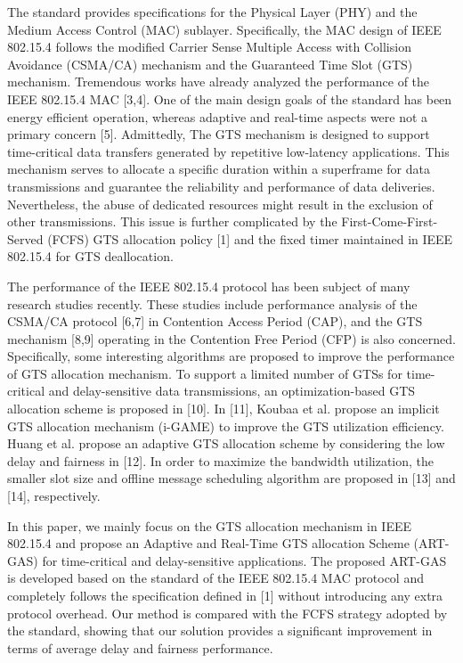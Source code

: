 \documentclass[letterpaper]{sig-alternate-10pt}
\begin{document}
The standard provides specifications for the Physical Layer (PHY) and the Medium Access Control (MAC) sublayer. Specifically, the MAC design of IEEE 802.15.4 follows the modified Carrier Sense Multiple Access with Collision Avoidance (CSMA/CA) mechanism and the Guaranteed Time Slot (GTS) mechanism. Tremendous works have already analyzed the performance of the IEEE 802.15.4 MAC [3,4]. One of the main design goals of the standard has been energy efficient operation, whereas adaptive and real-time aspects were not a primary concern [5]. Admittedly, The GTS mechanism is designed to support time-critical data transfers generated by repetitive low-latency applications. This mechanism serves to allocate a specific duration within a superframe for data transmissions and guarantee the reliability and performance of data deliveries. Nevertheless, the abuse of dedicated resources might result in the exclusion of other transmissions. This issue is further complicated by the First-Come-First-Served (FCFS) GTS allocation policy [1] and the fixed timer maintained in IEEE 802.15.4 for GTS deallocation.

The performance of the IEEE 802.15.4 protocol has been subject of many research studies recently. These studies include performance analysis of the CSMA/CA protocol [6,7] in Contention Access Period (CAP), and the GTS mechanism [8,9] operating in the Contention Free Period (CFP) is also concerned. Specifically, some interesting algorithms are proposed to improve the performance of GTS allocation mechanism. To support a limited number of GTSs for time-critical and delay-sensitive data transmissions, an optimization-based GTS allocation scheme is proposed in [10]. In [11], Koubaa et al. propose an implicit GTS allocation mechanism (i-GAME) to improve the GTS utilization efficiency. Huang et al. propose an adaptive GTS allocation scheme by considering the low delay and fairness in [12]. In order to maximize the bandwidth utilization, the smaller slot size and offline message scheduling algorithm are proposed in [13] and [14], respectively.

In this paper, we mainly focus on the GTS allocation mechanism in IEEE 802.15.4 and propose an Adaptive and Real-Time GTS allocation Scheme (ART-GAS) for time-critical and delay-sensitive applications. The proposed ART-GAS is developed based on the standard of the IEEE 802.15.4 MAC protocol and completely follows the specification defined in [1] without introducing any extra protocol overhead. Our method is compared with the FCFS strategy adopted by the standard, showing that our solution provides a significant improvement in terms of average delay and fairness performance.
\end{document}
